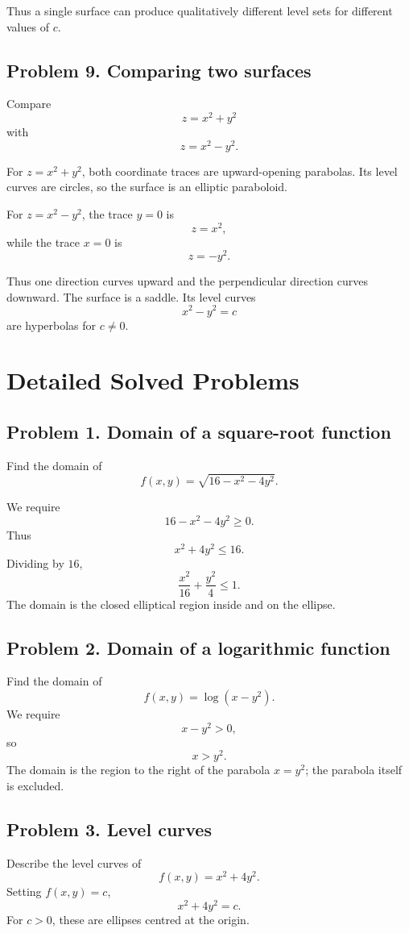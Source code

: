 \documentclass[11pt,oneside]{book}
\theoremstyle{studentthm}
\theoremstyle{definition}
\begin{document}
Thus a single surface can produce qualitatively different level sets
for different values of \(c\).

\subsection*{Problem 9. Comparing two surfaces}

Compare
\[
z=x^2+y^2
\]
with
\[
z=x^2-y^2.
\]

For \(z=x^2+y^2\), both coordinate traces are upward-opening
parabolas. Its level curves are circles, so the surface is an elliptic
paraboloid.

For \(z=x^2-y^2\), the trace \(y=0\) is
\[
z=x^2,
\]
while the trace \(x=0\) is
\[
z=-y^2.
\]

Thus one direction curves upward and the perpendicular direction
curves downward. The surface is a saddle. Its level curves
\[
x^2-y^2=c
\]
are hyperbolas for \(c\ne0\).


\section{Detailed Solved Problems}

\subsection*{Problem 1. Domain of a square-root function}
Find the domain of
\[
f(x,y)=\sqrt{16-x^2-4y^2}.
\]

We require
\[
16-x^2-4y^2\ge0.
\]
Thus
\[
x^2+4y^2\le16.
\]
Dividing by \(16\),
\[
\frac{x^2}{16}+\frac{y^2}{4}\le1.
\]
The domain is the closed elliptical region inside and on the ellipse.

\subsection*{Problem 2. Domain of a logarithmic function}
Find the domain of
\[
f(x,y)=\log(x-y^2).
\]
We require
\[
x-y^2>0,
\]
so
\[
x>y^2.
\]
The domain is the region to the right of the parabola \(x=y^2\);
the parabola itself is excluded.

\subsection*{Problem 3. Level curves}
Describe the level curves of
\[
f(x,y)=x^2+4y^2.
\]
Setting \(f(x,y)=c\),
\[
x^2+4y^2=c.
\]
For \(c>0\), these are ellipses centred at the origin.
\end{document}
